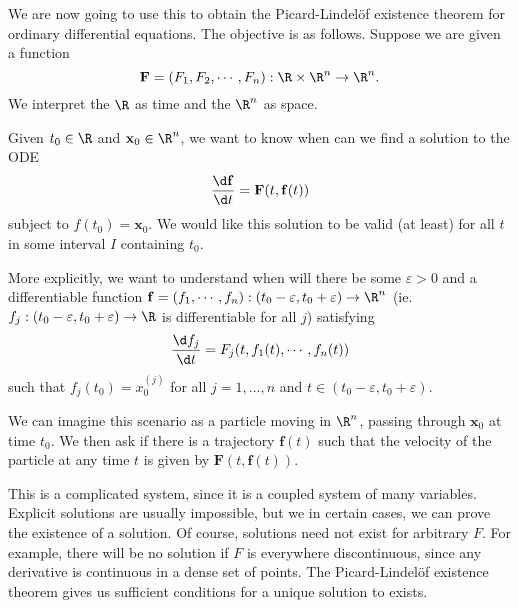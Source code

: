 \documentclass[a4paper]{article}
\begin{document}
We are now going to use this to obtain the Picard-Lindel\"of existence theorem for ordinary differential equations. The objective is as follows. Suppose we are given a function
\[
  \mathbf{F} = (F_1, F_2, \cdots, F_n): \R\times \R^n \to \R^n.
\]
We interpret the $\R$ as time and the $\R^n$ as space.

Given $t_0 \in \R$ and $\mathbf{x}_0 \in \R^n$, we want to know when can we find a solution to the ODE
\[
  \frac{\d \mathbf{f}}{\d t} = \mathbf{F}(t, \mathbf{f}(t))
\]
subject to $f(t_0) = \mathbf{x}_0$. We would like this solution to be valid (at least) for all $t$ in some interval $I$ containing $t_0$.

More explicitly, we want to understand when will there be some $\varepsilon > 0$ and a differentiable function $\mathbf{f} = (f_1, \cdots, f_n): (t_0 - \varepsilon, t_0 + \varepsilon) \to \R^n$ (ie. $f_j: (t_0 - \varepsilon, t_0 + \varepsilon) \to \R$ is differentiable for all $j$) satisfying
\[
  \frac{\d f_j}{\d t} = F_j(t, f_1(t), \cdots, f_n(t))
\]
such that $f_j(t_0) = x_0^{(j)}$ for all $j = 1, \ldots, n$ and $t \in (t_0 - \varepsilon, t_0 + \varepsilon)$.

We can imagine this scenario as a particle moving in $\R^n$, passing through $\mathbf{x}_0$ at time $t_0$. We then ask if there is a trajectory $\mathbf{f}(t)$ such that the velocity of the particle at any time $t$ is given by $\mathbf{F}(t, \mathbf{f}(t))$.

This is a complicated system, since it is a coupled system of many variables. Explicit solutions are usually impossible, but we in certain cases, we can prove the existence of a solution. Of course, solutions need not exist for arbitrary $F$. For example, there will be no solution if $F$ is everywhere discontinuous, since any derivative is continuous in a dense set of points. The Picard-Lindel\"of existence theorem gives us sufficient conditions for a unique solution to exists.
\end{document}

